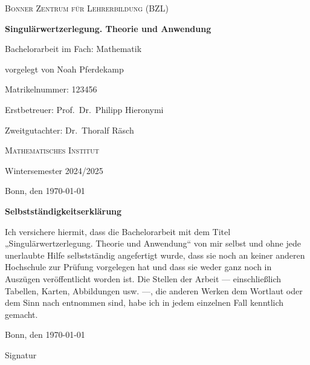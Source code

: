 \begin{titlepage}
    \centering

    
    {\LARGE\textsc{ Bonner Zentrum für Lehrerbildung (BZL)}}\par\vspace{5cm}

    
    {\Huge\bfseries Singulärwertzerlegung. Theorie und Anwendung}\par\vspace{1.5cm}

    
    {\Large Bachelorarbeit im Fach: Mathematik}\par\vspace{1cm}

    
    {\Large vorgelegt von Noah Pferdekamp}\par\vspace{2pt}
    {\large Matrikelnummer: \color{red}123456}\par\vspace{1cm}

    
    {\large Erstbetreuer: Prof.\ Dr.\ Philipp Hieronymi}\par\vspace{2pt}
    {\large Zweitgutachter: Dr.\ Thoralf Räsch}\par\vspace{2pt}
    {\large\textsc{Mathematisches Institut}\par\vspace{1cm}}

    
    {\large Wintersemester 2024/2025}\par\vspace{2pt}
    {\large Bonn, den \today}\par

    
\end{titlepage}
\thispagestyle{empty}
\noindent\textbf{Selbstständigkeitserklärung}
\vspace{1em}


\noindent Ich versichere hiermit, dass die Bachelorarbeit mit dem Titel „Singulärwertzerlegung. Theorie und Anwendung“ von mir selbst und ohne jede unerlaubte Hilfe selbstständig angefertigt wurde, dass sie noch an keiner anderen Hochschule zur Prüfung vorgelegen hat und dass sie weder ganz noch in Auszügen veröffentlicht worden ist. Die Stellen der Arbeit ---  einschließlich Tabellen, Karten, Abbildungen usw. ---, die anderen Werken dem Wortlaut oder dem Sinn nach entnommen sind, habe ich in jedem einzelnen Fall kenntlich gemacht. 
\vspace{1em}

\noindent Bonn, den \today

\vspace{-2pt}
{\color{red} Signatur}
